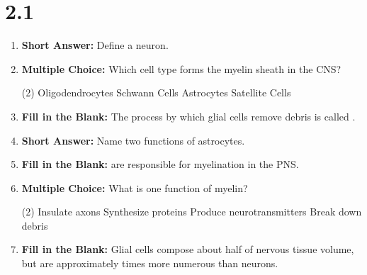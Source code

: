 \section*{2.1}
\begin{enumerate}[label=\textbf{Q2.1.\arabic*}]
      \item \textbf{Short Answer:} Define a neuron. \\
      \item \textbf{Multiple Choice:} Which cell type forms the myelin sheath in the CNS?
            \begin{tasks}[label=\textcolor{draculafg}{(\Alph*)}, item-format=\color{draculafg}, label-width=1.5em, item-indent=1.7em](2)
                  \task Oligodendrocytes
                  \task Schwann Cells
                  \task Astrocytes
                  \task Satellite Cells
            \end{tasks}
      \item \textbf{Fill in the Blank:} The process by which glial cells remove debris is called \underline{\hspace{3cm}}. \\
      \item \textbf{Short Answer:} Name two functions of astrocytes. \\
      \item \textbf{Fill in the Blank:} \underline{\hspace{3cm}} are responsible for myelination in the PNS. \\
      \item \textbf{Multiple Choice:} What is one function of myelin?
            \begin{tasks}[label=\textcolor{draculafg}{(\Alph*)}, item-format=\color{draculafg}, label-width=1.5em, item-indent=1.7em](2)
                  \task Insulate axons
                  \task Synthesize proteins
                  \task Produce neurotransmitters
                  \task Break down debris
            \end{tasks}
      \item \textbf{Fill in the Blank:} Glial cells compose about half of nervous tissue volume, but are approximately \underline{\hspace{3cm}} times more numerous than neurons. \\


\end{enumerate}
